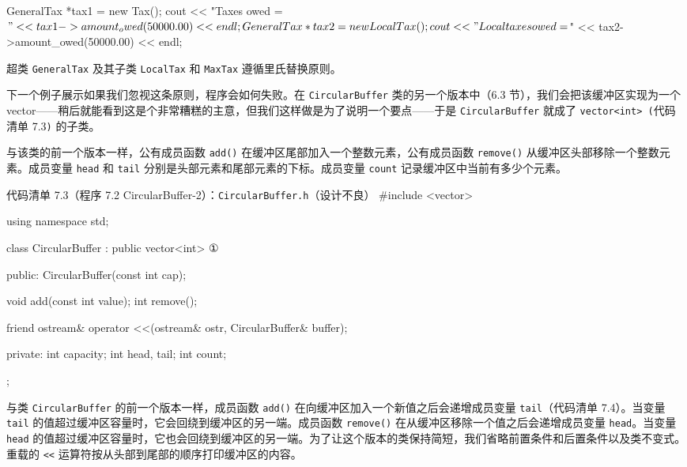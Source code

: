 \begin{codebox}
    GeneralTax *tax1 = new Tax();
    cout << "Taxes owed = $"
         << tax1->amount_owed(50000.00) << endl;

    GeneralTax *tax2 = new LocalTax();
    cout << "Local taxes owed = $"
         << tax2->amount_owed(50000.00) << endl;
\end{codebox}

超类 \texttt{General\allowbreak{}Tax} 及其子类 \texttt{LocalTax} 和 \texttt{MaxTax} 遵循里氏替换原则。

下一个例子展示如果我们忽视这条原则，程序会如何失败。在 \texttt{Circular\allowbreak{}Buffer} 类的另一个版本中（6.3 节），我们会把该缓冲区实现为一个 vector——稍后就能看到这是个非常糟糕的主意，但我们这样做是为了说明一个要点——于是 \texttt{Circular\allowbreak{}Buffer} 就成了 \texttt{vector<int> (\allowbreak{}}代码清单 7.3\texttt{)} 的子类。


与该类的前一个版本一样，公有成员函数 \texttt{add()} 在缓冲区尾部加入一个整数元素，公有成员函数 \texttt{remove()} 从缓冲区头部移除一个整数元素。成员变量 \texttt{head} 和 \texttt{tail} 分别是头部元素和尾部元素的下标。成员变量 \texttt{count} 记录缓冲区中当前有多少个元素。

\begin{codeboxt}{代码清单 7.3（程序 7.2 CircularBuffer-2）：\texttt{Circular\allowbreak{}Buffer.\allowbreak{}h}（设计不良）}
#include <vector>

using namespace std;

class CircularBuffer : public vector<int>        ①
{
public:
    CircularBuffer(const int cap);

    void add(const int value);
    int remove();

    friend ostream& operator <<(ostream& ostr,
                                CircularBuffer& buffer);

private:
    int capacity;
    int head, tail;
    int count;
};
\end{codeboxt}
\par

与类 \texttt{Circular\allowbreak{}Buffer} 的前一个版本一样，成员函数 \texttt{add()} 在向缓冲区加入一个新值之后会递增成员变量 \texttt{tail}（代码清单 7.4）。当变量 \texttt{tail} 的值超过缓冲区容量时，它会回绕到缓冲区的另一端。成员函数 \texttt{remove()} 在从缓冲区移除一个值之后会递增成员变量 \texttt{head}。当变量 \texttt{head} 的值超过缓冲区容量时，它也会回绕到缓冲区的另一端。为了让这个版本的类保持简短，我们省略前置条件和后置条件以及类不变式。重载的 \texttt{<<} 运算符按从头部到尾部的顺序打印缓冲区的内容。


